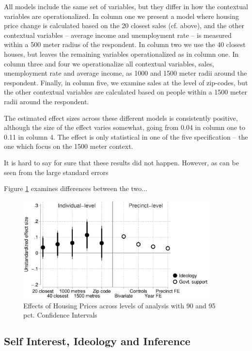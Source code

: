 \documentclass[12pt,a4paper]{article}
\begin{document}
All models include the same set of variables, but they differ in how the contextual variables are operationalized. In column one we present a model where housing price change is calculated based on the 20 closest sales (cf. above), and the other contextual variables -- average income and unemployment rate -- is measured within a 500 meter radius of the respondent. In column two we use the 40 closest houses, but leaves the remaining variables operationalized as in column one. In column three and four we operationalize all contextual variables, sales, unemployment rate and average income, as 1000 and 1500 meter radii around the respondent. Finally, in column five, we examine sales at the level of zip-codes, but the other contextual variables are calculated based on people within a 1500 meter radii around the respondent.



The estimated effect sizes across these different models is consistently positive, although the size of the effect varies somewhat, going from 0.04 in column one to 0.11 in column 4. The effect is only statistical in one of the five specification -- the one which focus on the 1500 meter context. 

It is hard to say for sure that these results did not happen. However, as can be seen from the large standard errors

Figure \ref{comparison} examines differences between the two...



\begin{figure}[htbp!]
	\includegraphics[width=0.9\textwidth]{../figures/comparison.eps}
	\centering
	\caption{Effects of Housing Prices across levels of analysis with 90  and 95 pct. Confidence Intervals}\label{comparison}
\end{figure}


\subsection{Self Interest, Ideology and Inference}
\end{document}
